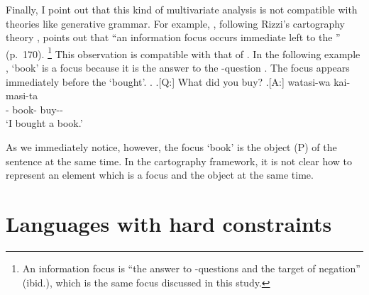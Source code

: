 
Finally, I point out that this kind of multivariate analysis
is not compatible with theories like generative grammar.
For example,
, following Rizzi's cartography theory \cite[e.g.,][]{rizzi97,rizzi04},
points out that ``an information focus occurs immediate left to the '' (p.~170).%
 \footnote{
 An information focus is ``the answer to -questions and the target of negation'' (ibid.),
 which is the same focus discussed in this study.
 }
This observation is compatible with that of .
In the following example \Next[A],
 `book' is a focus because it is the answer to the -question \Next[Q].
The focus appears immediately before the   `bought'.
%
\ex.
 \a.[Q:] What did you buy?
 \bg.[A:] watasi-wa  kai-masi-ta \\
          - book- buy-- \\
          `I bought a book.'
  \hfill{\cite[170--171]{endo14}}

As we immediately notice, however,
the focus  `book' is the object (P) of the sentence at the same time.
In the cartography framework,
it is not clear how to represent an element which is a focus and the object
at the same time.





\section{Languages with hard constraints}\label{Disc:HardConst}

